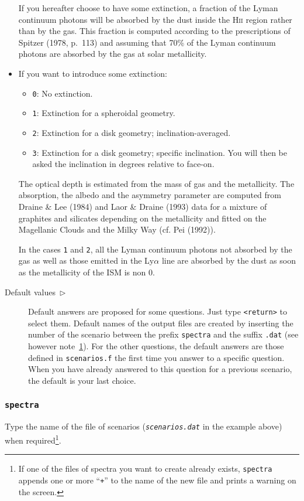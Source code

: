 \documentclass[11pt,draft,fleqn]{article}
\begin{document}
\begin{itemize}
If you hereafter choose to have some extinction, a fraction of the
Lyman continuum photons will be absorbed by the dust inside the H\textsc{ii}
region rather than by the gas. This fraction is computed according
to the prescriptions of Spitzer (1978, p.~113) and assuming 
that 70\%
of the Lyman continuum photons are absorbed by the gas at solar metallicity.
\item If you want to introduce some extinction:
\begin{itemize}
\item \texttt{0}: No extinction.
\item \texttt{1}: Extinction for a spheroidal geometry.
\item \texttt{2}: Extinction for a disk geometry; inclination-averaged.
\item \texttt{3}: Extinction for a disk geometry; specific inclination. 
You will then be asked the inclination in degrees relative to
face-on.
\end{itemize}
The optical depth is estimated from the mass of gas and the metallicity.
The absorption, the albedo and the asymmetry parameter are computed 
from Draine \& Lee (1984) and Laor \& Draine (1993) data
for a mixture
of graphites and silicates depending on the metallicity and fitted on the 
Magellanic Clouds and the Milky Way (cf. Pei (1992)).

In the cases \texttt{1} and \texttt{2}, all the Lyman continuum photons not absorbed by the gas as 
well as those emitted in the Ly${\alpha}$ line are absorbed by the
dust as soon as the metallicity of the ISM is non 0.
\end{itemize}
\begin{description}
\item[Default values~$\triangleright$]Default answers are proposed 
for some questions. Just
type \texttt{<return>} to select them. 
Default names of the output files are created by inserting 
the number of the scenario between the prefix
\texttt{spectra} and the suffix \texttt{.dat} (see however note~\ref{plus}).
For the other questions, the default answers are those defined in 
\texttt{scenarios.f} the first time you answer to a specific
question. When you have already answered to this question for a
previous scenario, the default is your last choice.
\end{description}
\subsubsection{\texttt{spectra}}
Type the name of the file of scenarios (\texttt{\emph{scenarios.dat}}
in the example above) when required\footnote{If one of the files of spectra you want to create already exists, \texttt{spectra}
appends one or more ``\texttt{+}'' to the name of the new file
and prints a warning on the screen.\label{plus}}.
\end{document}
